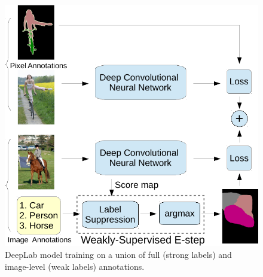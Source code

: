 \begin{figure}[htbp!]
  \centering
  \includegraphics[width=0.9\linewidth]{fig/model_train_twoEnd.pdf} 
  \caption{DeepLab model training on a union of full (strong labels) 
    and image-level (weak labels) annotations.}
  \label{fig:model_illustrations_twoEnd}
\end{figure}



